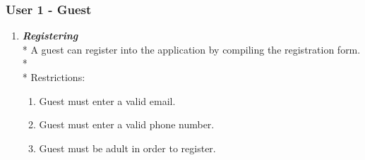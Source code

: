 \subsubsection{User 1 - Guest}
\begin{enumerate}
\item \textit{\textbf{Registering}}\\*
A guest can register into the application by compiling the registration form.\\*\\*
Restrictions:
\begin{enumerate}
\item Guest must enter a valid email.
\item Guest must enter a valid phone number.
\item Guest must be adult in order to register.
\end{enumerate}
\end{enumerate}